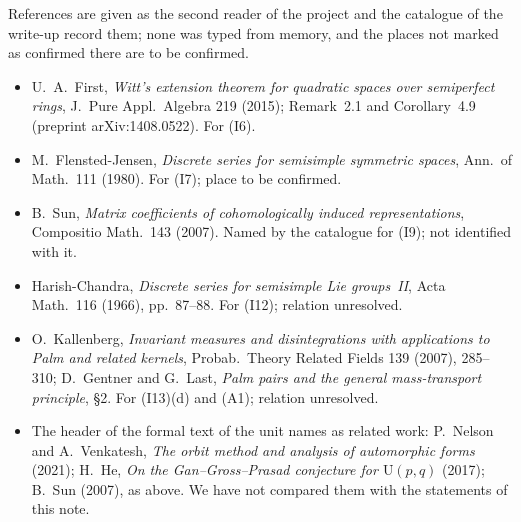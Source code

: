 \documentclass[11pt,a4paper]{article}
\newcommand{\head}[1]{\par\addvspace{17pt plus 4pt minus 2pt}\Needspace{6\baselineskip}%
  \noindent{\fontsize{13.2}{16}\selectfont\bfseries\color{ink}#1}\par\nopagebreak\vspace{-1pt}}
\theoremstyle{plainx}
\theoremstyle{uprightx}
\newcommand{\inp}[1]{\textup{(I#1)}}
\begin{document}
\head{References}
{\fontsize{9.4}{12.6}\selectfont\raggedright
References are given as the second reader of the project and the catalogue of the write-up record them; none
was typed from memory, and the places not marked as confirmed there are to be confirmed.
\begin{itemize}[leftmargin=1.6em,itemsep=1pt]
\item U.~A.~First, \emph{Witt's extension theorem for quadratic spaces over semiperfect rings}, J.~Pure Appl.\ Algebra
  219 (2015); Remark~2.1 and Corollary~4.9 (preprint arXiv:1408.0522). For \inp{6}.
\item M.~Flensted-Jensen, \emph{Discrete series for semisimple symmetric spaces}, Ann.\ of Math.\ 111 (1980). For
  \inp{7}; place to be confirmed.
\item B.~Sun, \emph{Matrix coefficients of cohomologically induced representations}, Compositio Math.\ 143 (2007).
  Named by the catalogue for \inp{9}; not identified with it.
\item Harish-Chandra, \emph{Discrete series for semisimple Lie groups~II}, Acta Math.\ 116 (1966), pp.~87--88. For
  \inp{12}; relation unresolved.
\item O.~Kallenberg, \emph{Invariant measures and disintegrations with applications to Palm and related kernels},
  Probab.\ Theory Related Fields 139 (2007), 285--310; D.~Gentner and G.~Last, \emph{Palm pairs and the general
  mass-transport principle}, §2. For \inp{13}(d) and (A1); relation unresolved.
\item The header of the formal text of the unit names as related work: P.~Nelson and A.~Venkatesh, \emph{The orbit
  method and analysis of automorphic forms} (2021); H.~He, \emph{On the Gan--Gross--Prasad conjecture for
  $\mathrm{U}(p,q)$} (2017); B.~Sun (2007), as above. We have not compared them with the statements of this note.
\end{itemize}}
\end{document}
